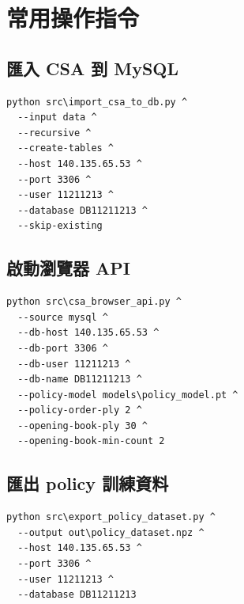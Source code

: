 \documentclass[12pt,a4paper,fontset=none]{ctexart}
\begin{document}
\appendix
\section{常用操作指令}

\subsection{匯入 CSA 到 MySQL}

\begin{lstlisting}[style=cmd]
python src\import_csa_to_db.py ^
  --input data ^
  --recursive ^
  --create-tables ^
  --host 140.135.65.53 ^
  --port 3306 ^
  --user 11211213 ^
  --database DB11211213 ^
  --skip-existing
\end{lstlisting}

\subsection{啟動瀏覽器 API}

\begin{lstlisting}[style=cmd]
python src\csa_browser_api.py ^
  --source mysql ^
  --db-host 140.135.65.53 ^
  --db-port 3306 ^
  --db-user 11211213 ^
  --db-name DB11211213 ^
  --policy-model models\policy_model.pt ^
  --policy-order-ply 2 ^
  --opening-book-ply 30 ^
  --opening-book-min-count 2
\end{lstlisting}

\subsection{匯出 policy 訓練資料}

\begin{lstlisting}[style=cmd]
python src\export_policy_dataset.py ^
  --output out\policy_dataset.npz ^
  --host 140.135.65.53 ^
  --port 3306 ^
  --user 11211213 ^
  --database DB11211213
\end{lstlisting}
\end{document}
